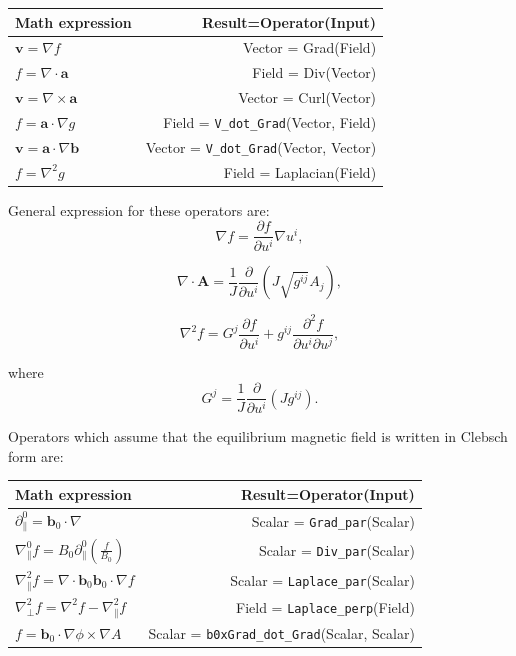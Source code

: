 \documentclass[11pt, oneside]{article}
\begin{document}
\begin{tabular}{| l | r |} \hline		
  Math expression & Result=Operator(Input) \\ \hline
  $\mathbf{v} = \nabla f$ & Vector = Grad(Field) \\
  $f = \nabla \cdot \mathbf{a}$ & Field = Div(Vector) \\
  $\mathbf{v} = \nabla \times \mathbf{a}$ & Vector = Curl(Vector) \\
  $f = \mathbf{a} \cdot \nabla g$ & Field = \verb|V_dot_Grad|(Vector, Field) \\
  $\mathbf{v} = \mathbf{a} \cdot \nabla \mathbf{b}$ & Vector = \verb|V_dot_Grad|(Vector, Vector) \\
  $f = \nabla^2 g$ & Field = Laplacian(Field) \\ \hline
\end{tabular}


General expression for these operators are:
\begin{equation}\label{grad}
\nabla f = \frac{\partial f}{\partial u^i} \nabla u^i,
\end{equation}

\begin{equation}\label{div}
\nabla \cdot \mathbf{A} = \frac{1}{J} \frac{\partial}{\partial u^i} \left( J \sqrt{g^{ij}} A_j \right),
\end{equation}

\begin{equation}\label{laplacian}
\nabla^2 f = G^j \frac{\partial f}{\partial u^i} + g^{ij} \frac{\partial^2 f}{\partial u^i \partial u^j},
\end{equation}

where
\begin{equation}\label{gees}
G^j = \frac1{J}\frac{\partial}{\partial u^i}\left( J g^{ij} \right).
\end{equation}


Operators which assume that the equilibrium magnetic field is written in Clebsch form are:
\newline

\begin{tabular}{| l | r |} \hline		
  Math expression & Result=Operator(Input) \\ \hline
  $\partial^0_{\parallel} = \mathbf{b}_0 \cdot \nabla$ & Scalar = \verb|Grad_par|(Scalar) \\
  $\nabla^0_{\parallel}f = B_0\partial^0_{\parallel} \left(\frac{f}{B_0}\right)$ & Scalar = \verb|Div_par|(Scalar) \\
  $\nabla^2_{\parallel}f = \nabla \cdot \mathbf{b}_0\mathbf{b}_0 \cdot \nabla f$ & Scalar = \verb|Laplace_par|(Scalar) \\
  $\nabla^2_{\perp}f = \nabla^2 f - \nabla^2_{\parallel} f$ & Field =  \verb|Laplace_perp|(Field) \\
  $f = \mathbf{b}_0 \cdot \nabla \phi \times \nabla A$ & Scalar = \verb|b0xGrad_dot_Grad|(Scalar, Scalar) \\ \hline
\end{tabular}
\newline
\end{document}
